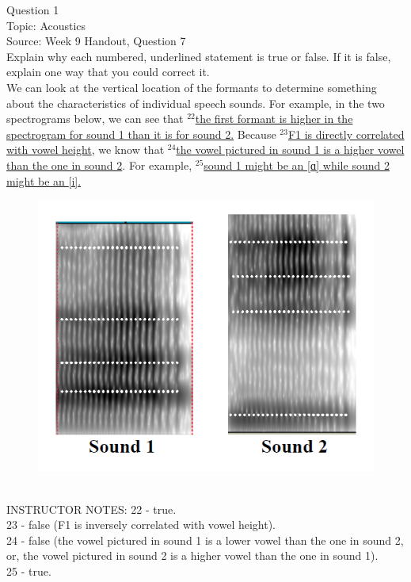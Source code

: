 \documentclass[12pt]{article}
\begin{document}
{\large Question 1}\\

Topic: Acoustics\\
Source: Week 9 Handout, Question 7\\

Explain why each numbered, underlined statement is true or false. If it is false, explain one way that you could correct it.\\

We can look at the vertical location of the formants to determine something about the characteristics of individual speech sounds. For example, in the two spectrograms below, we can see that $^{22}$\ul{the first formant is higher in the spectrogram for sound 1 than it is for sound 2.} Because $^{23}$\ul{F1 is directly correlated with vowel height}, we know that $^{24}$\ul{the vowel pictured in sound 1 is a higher vowel than the one in sound 2}. For example, $^{25}$\ul{sound 1 might be an {[ɑ]} while sound 2 might be an {[i]}.}

\begin{figure}[H]
\includegraphics{../images/sound1a_sound2i.png}
\end{figure}

~\\
INSTRUCTOR NOTES: 22 - true. \\23 - false (F1 is inversely correlated with vowel height). \\24 - false (the vowel pictured in sound 1 is a lower vowel than the one in sound 2, or, the vowel pictured in sound 2 is a higher vowel than the one in sound 1).\\25 - true.
\end{document}
